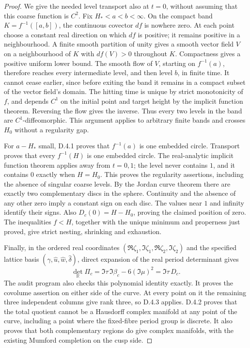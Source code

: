 \begin{proof}
We give the needed level transport also at \(t=0\), without
assuming that this coarse function is \(C^2\). Fix
\(H_*<a<b<\infty\). On the compact band
\(K=f^{-1}([a,b])\), the continuous covector \(df\) is nowhere
zero. At each point choose a constant real direction on which
\(df\) is positive; it remains positive in a neighbourhood.
A finite smooth partition of unity gives a smooth vector field
\(V\) on a neighbourhood of \(K\) with \(df(V)>0\) throughout
\(K\). Compactness gives a positive uniform lower bound. The
smooth flow of \(V\), starting on \(f^{-1}(a)\), therefore reaches
every intermediate level, and then level \(b\), in finite time.
It cannot cease earlier, since before exiting the band it remains
in a compact subset of the vector field's domain. The hitting time
is unique by strict monotonicity of \(f\), and depends \(C^1\) on
the initial point and target height by the implicit function theorem.
Reversing the flow gives the inverse. Thus every two levels in the
band are \(C^1\)-diffeomorphic. This argument applies to arbitrary
finite bands and crosses \(H_0\) without a regularity gap.

For \(a-H_*\) small, D.4.1 proves that \(f^{-1}(a)\) is one
embedded circle. Transport proves that every \(f^{-1}(H)\) is
one embedded circle. The real-analytic implicit function theorem
applies away from \(t=0,1\); the level never contains \(1\),
and it contains \(0\) exactly when \(H=H_0\). This proves the
regularity assertions, including the absence of singular coarse
levels. By the Jordan curve theorem there are exactly two
complementary discs in the sphere. Continuity and the absence of
any other zero imply a constant sign on each disc. The values near
\(1\) and infinity identify their signs. Also
\(D_c(0)=H-H_0\), proving the claimed position of zero. The
inequalities \(f<H\), together with the unique minimum and
properness just proved, give strict nesting, shrinking and
exhaustion.

Finally, in the ordered real coordinates
\((\Re\zeta_1,\Im\zeta_1,\Re\zeta_2,\Im\zeta_2)\) and the
specified lattice basis \((\widehat\gamma,\widehat u,
\widehat w,\widehat\delta)\), direct expansion of the real
period determinant gives
\[
 \det_{\mathbb R}\Pi_c
 =\Im\tau\,\Im\beta_c-6(\Im\mu)^2
 =\Im\tau\,D_c.
\]
The audit program also checks this polynomial identity exactly.
It proves the covolume assertion on either side of the curve. At
every point on it the remaining three independent columns give
rank three, so D.4.3 applies. D.4.2 proves that the total quotient
cannot be a Hausdorff complex manifold at any point of the curve,
including a point where the fixed-fibre period group is discrete.
It also proves that both complementary regions do give complex
manifolds, with the existing Mumford completion on the cusp side.


\end{proof}
